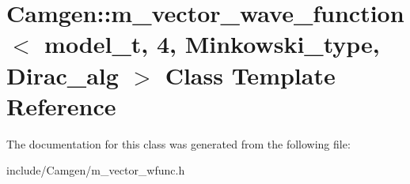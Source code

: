 \hypertarget{a00338}{}\section{Camgen\+:\+:m\+\_\+vector\+\_\+wave\+\_\+function$<$ model\+\_\+t, 4, Minkowski\+\_\+type, Dirac\+\_\+alg $>$ Class Template Reference}
\label{a00338}


The documentation for this class was generated from the following file\+:\begin{DoxyCompactItemize}
\item 
include/\+Camgen/m\+\_\+vector\+\_\+wfunc.\+h\end{DoxyCompactItemize}
